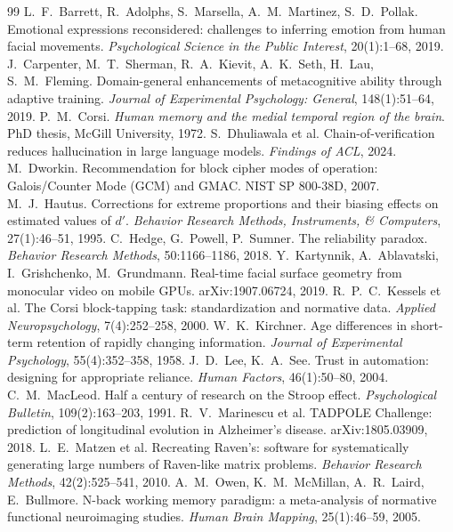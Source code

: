 \documentclass[11pt,a4paper]{article}
\begin{document}
\begin{thebibliography}{99}\small
\setlength{\itemsep}{0.1em}
 L.~F.~Barrett, R.~Adolphs, S.~Marsella, A.~M.~Martinez, S.~D.~Pollak. Emotional expressions reconsidered: challenges to inferring emotion from human facial movements. \emph{Psychological Science in the Public Interest}, 20(1):1--68, 2019.
 J.~Carpenter, M.~T.~Sherman, R.~A.~Kievit, A.~K.~Seth, H.~Lau, S.~M.~Fleming. Domain-general enhancements of metacognitive ability through adaptive training. \emph{Journal of Experimental Psychology: General}, 148(1):51--64, 2019.
 P.~M.~Corsi. \emph{Human memory and the medial temporal region of the brain}. PhD thesis, McGill University, 1972.
 S.~Dhuliawala et al. Chain-of-verification reduces hallucination in large language models. \emph{Findings of ACL}, 2024.
 M.~Dworkin. Recommendation for block cipher modes of operation: Galois/Counter Mode (GCM) and GMAC. NIST SP 800-38D, 2007.
 M.~J.~Hautus. Corrections for extreme proportions and their biasing effects on estimated values of $d'$. \emph{Behavior Research Methods, Instruments, \& Computers}, 27(1):46--51, 1995.
 C.~Hedge, G.~Powell, P.~Sumner. The reliability paradox. \emph{Behavior Research Methods}, 50:1166--1186, 2018.
 Y.~Kartynnik, A.~Ablavatski, I.~Grishchenko, M.~Grundmann. Real-time facial surface geometry from monocular video on mobile GPUs. arXiv:1907.06724, 2019.
 R.~P.~C.~Kessels et al. The Corsi block-tapping task: standardization and normative data. \emph{Applied Neuropsychology}, 7(4):252--258, 2000.
 W.~K.~Kirchner. Age differences in short-term retention of rapidly changing information. \emph{Journal of Experimental Psychology}, 55(4):352--358, 1958.
 J.~D.~Lee, K.~A.~See. Trust in automation: designing for appropriate reliance. \emph{Human Factors}, 46(1):50--80, 2004.
 C.~M.~MacLeod. Half a century of research on the Stroop effect. \emph{Psychological Bulletin}, 109(2):163--203, 1991.
 R.~V.~Marinescu et al. TADPOLE Challenge: prediction of longitudinal evolution in Alzheimer's disease. arXiv:1805.03909, 2018.
 L.~E.~Matzen et al. Recreating Raven's: software for systematically generating large numbers of Raven-like matrix problems. \emph{Behavior Research Methods}, 42(2):525--541, 2010.
 A.~M.~Owen, K.~M.~McMillan, A.~R.~Laird, E.~Bullmore. N-back working memory paradigm: a meta-analysis of normative functional neuroimaging studies. \emph{Human Brain Mapping}, 25(1):46--59, 2005.

\end{thebibliography}
\end{document}

